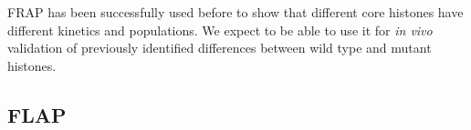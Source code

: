     FRAP has been successfully used before to show that different core histones have
    different kinetics and populations. We expect to be able to use it for \textit{in vivo}
    validation of previously identified differences between wild type and mutant histones.

  \subsection{FLAP}











